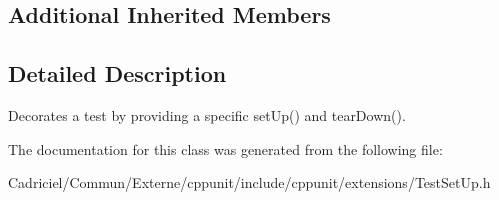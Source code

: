 \subsection*{Additional Inherited Members}


\subsection{Detailed Description}
Decorates a test by providing a specific set\-Up() and tear\-Down(). 

The documentation for this class was generated from the following file\-:\begin{DoxyCompactItemize}
\item 
Cadriciel/\-Commun/\-Externe/cppunit/include/cppunit/extensions/Test\-Set\-Up.\-h\end{DoxyCompactItemize}
